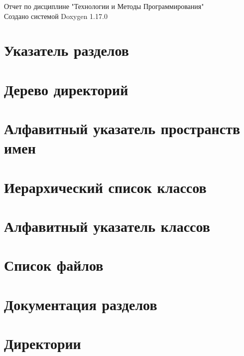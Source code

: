\documentclass[twoside]{book}
\newcommand{\+}{\discretionary{\mbox{\scriptsize$\hookleftarrow$}}{}{}}
\newcommand{\clearemptydoublepage}{%
    \newpage{\pagestyle{empty}\cleardoublepage}%
  }
\begin{document}
  \raggedbottom
    \hypersetup{pageanchor=false,
                bookmarksnumbered=true,
                pdfencoding=unicode
               }
  \begin{titlepage}
  \vspace*{7cm}
  \begin{center}%
  {\Large Отчет по дисциплине "{}Технологии и Методы Программирования"{}}\\
  \vspace*{1cm}
  {\large Создано системой Doxygen 1.17.0}\\
  \end{center}
  \end{titlepage}
  \clearemptydoublepage
  \tableofcontents
  \clearemptydoublepage
  \hypersetup{pageanchor=true}
\chapter{Указатель разделов}

\chapter{Дерево директорий}

\chapter{Алфавитный указатель пространств имен}

\chapter{Иерархический список классов}

\chapter{Алфавитный указатель классов}

\chapter{Список файлов}

\chapter{Документация разделов}


\chapter{Директории}










\end{document}
